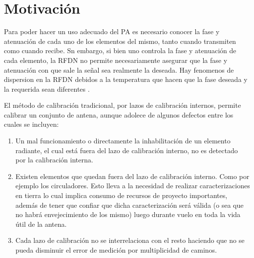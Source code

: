 \section{Motivación} \label{sc:motivation}

Para poder hacer un uso adecuado del PA es necesario conocer la fase y atenuación de cada uno de los elementos del mismo, tanto
cuando transmiten como cuando recibe. Sn embargo, si bien uno controla la fase y atenuación de cada elemento, la RFDN no permite
necesariamente asegurar que la fase y atenuación con que sale la señal sea realmente la deseada. Hay fenomenos de dispersion en
la RFDN debidos a la temperatura que hacen que la fase deseada y la requerida sean diferentes \cite{Keizer2011}.

El método de calibración tradicional, por lazos de calibración internos, permite calibrar un conjunto de antena, aunque
adolece de algunos defectos entre los cuales se incluyen:

\begin{enumerate}
    \item Un mal funcionamiento o directamente la inhabilitación de un elemento radiante, el cual está fuera del lazo de
      calibración interno, no es detectado por la calibración interna.
    \item Existen elementos que quedan fuera del lazo de calibración interno. Como por ejemplo los circuladores. Esto lleva a
			la necesidad de realizar caracterizaciones en tierra lo cual implica consumo de recursos de proyecto importantes,
			además de tener que confiar que dicha caracterización será válida (o sea que no habrá envejecimiento de los mismo)
			luego durante vuelo en toda la vida útil de la antena.
    \item Cada lazo de calibración no se interrelaciona con el resto haciendo que no se pueda disminuir el error de medición por
			multiplicidad de caminos.
\end{enumerate}

